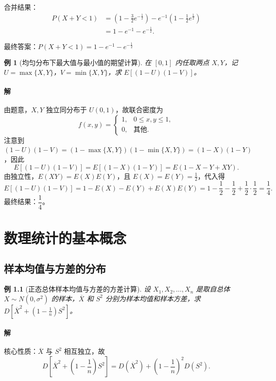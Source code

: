 \documentclass{book}
\newtheorem{example}{例}[subsection]
\begin{document}
合并结果：
\[
\begin{aligned}
P(X+Y < 1) &= \left( 1 - \frac{3}{2} e^{-\frac{1}{2}} \right) - e^{-1} \left( 1 - \frac{1}{2} e^{\frac{1}{2}} \right) \\
&= 1 - e^{-1} - e^{-\frac{1}{2}}.
\end{aligned}
\]

最终答案：$\boxed{P(X+Y < 1) = 1 - e^{-1} - e^{-\frac{1}{2}}}$


\begin{example}[均匀分布下最大值与最小值的期望计算]
在 $[0,1]$ 内任取两点 $X,Y$，记 $U = \max\{X,Y\}$，$V = \min\{X,Y\}$，求 $E[(1-U)(1-V)]$。
\end{example}

\subsubsection{解}
由题意，$X,Y$ 独立同分布于 $U(0,1)$，故联合密度为
\[
f(x,y) = \begin{cases}
1, & 0 \le x,y \le 1, \\
0, & \text{其他}.
\end{cases}
\]
注意到 $(1-U)(1-V) = (1-\max\{X,Y\})(1-\min\{X,Y\}) = (1-X)(1-Y)$，因此
\[
E[(1-U)(1-V)] = E[(1-X)(1-Y)] = E(1 - X - Y + XY).
\]
由独立性，$E(XY) = E(X)E(Y)$，且 $E(X) = E(Y) = \frac{1}{2}$，代入得
\[
E[(1-U)(1-V)] = 1 - E(X) - E(Y) + E(X)E(Y) = 1 - \frac{1}{2} - \frac{1}{2} + \frac{1}{2} \cdot \frac{1}{2} = \frac{1}{4}.
\]
最终结果：$\boxed{\dfrac{1}{4}}$。

\chapter{数理统计的基本概念}
\section{样本均值与方差的分布}

\begin{example}[正态总体样本均值与方差的方差计算]
设 $X_1,X_2,\dots,X_n$ 是取自总体 $X \sim N(0,\sigma^2)$ 的样本，$\overline{X}$ 和 $S^2$ 分别为样本均值和样本方差，求 $D\left[\overline{X}^2 + \left(1 - \frac{1}{n}\right)S^2\right]$。
\end{example}

\subsubsection{解}
核心性质：$\overline{X}$ 与 $S^2$ 相互独立，故
\[
D\left[\overline{X}^2 + \left(1 - \frac{1}{n}\right)S^2\right] = D(\overline{X}^2) + \left(1 - \frac{1}{n}\right)^2 D(S^2).
\]
\end{document}
